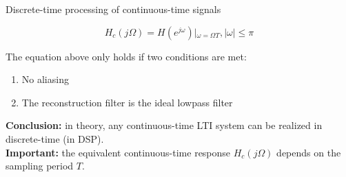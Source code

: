 \documentclass[10pt]{beamer}
\begin{document}
%
\begin{frame}{Discrete-time processing of continuous-time signals}
	\vspace{-0.5cm}
	\begin{center}
		\def\Heff{1}
		\resizebox{\linewidth}{!}{}
	\end{center}
	\pause
	\begin{equation*}
	H_{c}(j\Omega) = H(e^{j\omega})|_{\omega = \Omega T}, |\omega| \leq \pi
	\end{equation*}
	
	The equation above only holds if two conditions are met:
	\begin{enumerate}
		\item No aliasing
		\item The reconstruction filter is the ideal lowpass filter
	\end{enumerate}
	\pause
	\textbf{Conclusion:} in theory, any continuous-time LTI system can be realized in discrete-time (in DSP).\\
	\textbf{Important:} the equivalent continuous-time response $H_{c}(j\Omega)$ depends on the sampling period $T$.
\end{frame}
\end{document}
